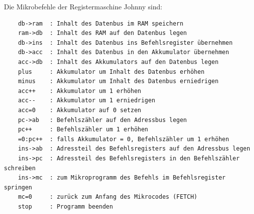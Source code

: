 
Die Mikrobefehle der Registermaschine Johnny sind:

\begin{verbatim}
    db->ram  : Inhalt des Datenbus im RAM speichern
    ram->db  : Inhalt des RAM auf den Datenbus legen
    db->ins  : Inhalt des Datenbus ins Befehlsregister übernehmen
    db->acc  : Inhalt des Datenbus in den Akkumulator übernehmen
    acc->db  : Inhalt des Akkumulators auf den Datenbus legen
    plus     : Akkumulator um Inhalt des Datenbus erhöhen
    minus    : Akkumulator um Inhalt des Datenbus erniedrigen
    acc++    : Akkumulator um 1 erhöhen
    acc--    : Akkumulator um 1 erniedrigen
    acc=0    : Akkumulator auf 0 setzen
    pc->ab   : Befehlszähler auf den Adressbus legen
    pc++     : Befehlszähler um 1 erhöhen
    =0:pc++  : falls Akkumulator = 0, Befehlszähler um 1 erhöhen
    ins->ab  : Adressteil des Befehlsregisters auf den Adressbus legen
    ins->pc  : Adressteil des Befehlsregisters in den Befehlszähler schreiben
    ins->mc  : zum Mikroprogramm des Befehls im Befehlsregister springen
    mc=0     : zurück zum Anfang des Mikrocodes (FETCH)
    stop     : Programm beenden
\end{verbatim}

